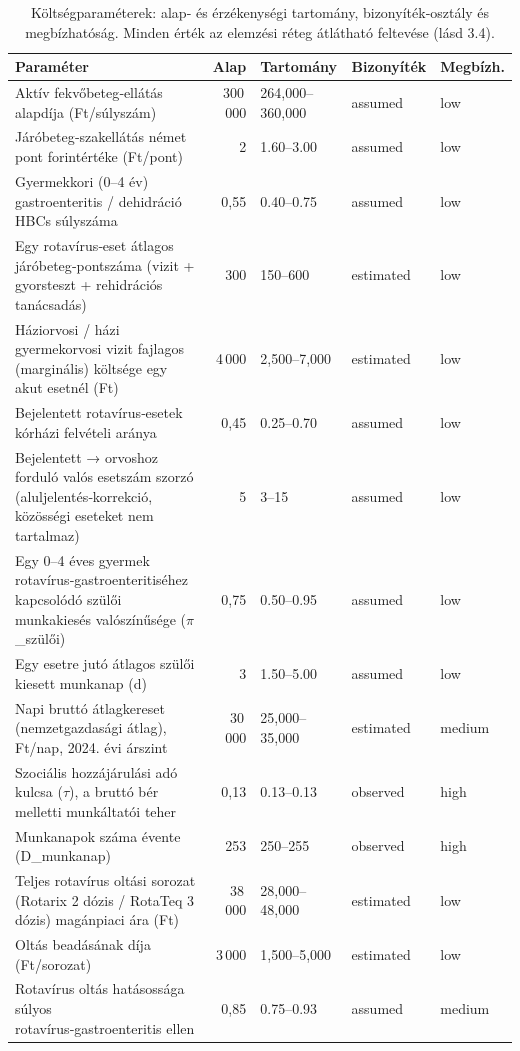 \begin{table}[htbp]
\centering
\small
\begin{tabular}{p{5.4cm}rp{2.9cm}ll}
\toprule
Paraméter & Alap & Tartomány & Bizonyíték & Megbízh. \\
\midrule
Aktív fekvőbeteg‑ellátás alapdíja (Ft/súlyszám) & 300\,000 & 264,000--360,000 & assumed & low \\
Járóbeteg‑szakellátás német pont forintértéke (Ft/pont) & 2 & 1.60--3.00 & assumed & low \\
Gyermekkori (0--4 év) gastroenteritis / dehidráció HBCs súlyszáma & 0{,}55 & 0.40--0.75 & assumed & low \\
Egy rotavírus‑eset átlagos járóbeteg‑pontszáma (vizit + gyorsteszt + rehidrációs tanácsadás) & 300 & 150--600 & estimated & low \\
Háziorvosi / házi gyermekorvosi vizit fajlagos (marginális) költsége egy akut esetnél (Ft) & 4\,000 & 2,500--7,000 & estimated & low \\
Bejelentett rotavírus‑esetek kórházi felvételi aránya & 0{,}45 & 0.25--0.70 & assumed & low \\
Bejelentett → orvoshoz forduló valós esetszám szorzó (aluljelentés‑korrekció, közösségi eseteket nem tartalmaz) & 5 & 3--15 & assumed & low \\
Egy 0--4 éves gyermek rotavírus‑gastroenteritiséhez kapcsolódó szülői munkakiesés valószínűsége ($\pi$\_szülői) & 0{,}75 & 0.50--0.95 & assumed & low \\
Egy esetre jutó átlagos szülői kiesett munkanap (d) & 3 & 1.50--5.00 & assumed & low \\
Napi bruttó átlagkereset (nemzetgazdasági átlag), Ft/nap, 2024. évi árszint & 30\,000 & 25,000--35,000 & estimated & medium \\
Szociális hozzájárulási adó kulcsa ($\tau$), a bruttó bér melletti munkáltatói teher & 0{,}13 & 0.13--0.13 & observed & high \\
Munkanapok száma évente (D\_munkanap) & 253 & 250--255 & observed & high \\
Teljes rotavírus oltási sorozat (Rotarix 2 dózis / RotaTeq 3 dózis) magánpiaci ára (Ft) & 38\,000 & 28,000--48,000 & estimated & low \\
Oltás beadásának díja (Ft/sorozat) & 3\,000 & 1,500--5,000 & estimated & low \\
Rotavírus oltás hatásossága súlyos rotavírus‑gastroenteritis ellen & 0{,}85 & 0.75--0.93 & assumed & medium \\
\bottomrule
\end{tabular}
\caption{Költségparaméterek: alap‑ és érzékenységi tartomány, bizonyíték‑osztály és megbízhatóság. Minden érték az elemzési réteg átlátható feltevése (lásd 3.4).}
\label{tab:cost}
\end{table}
